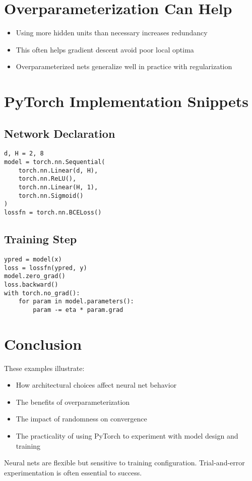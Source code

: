 \documentclass[11pt]{article}
\begin{document}
\section{Overparameterization Can Help}

\begin{itemize}
    \item Using more hidden units than necessary increases redundancy
    \item This often helps gradient descent avoid poor local optima
    \item Overparameterized nets generalize well in practice with regularization
\end{itemize}

\section{PyTorch Implementation Snippets}

\subsection*{Network Declaration}
\begin{verbatim}
d, H = 2, 8
model = torch.nn.Sequential(
    torch.nn.Linear(d, H),
    torch.nn.ReLU(),
    torch.nn.Linear(H, 1),
    torch.nn.Sigmoid()
)
lossfn = torch.nn.BCELoss()
\end{verbatim}

\subsection*{Training Step}
\begin{verbatim}
ypred = model(x)
loss = lossfn(ypred, y)
model.zero_grad()
loss.backward()
with torch.no_grad():
    for param in model.parameters():
        param -= eta * param.grad
\end{verbatim}

\section{Conclusion}

These examples illustrate:
\begin{itemize}
    \item How architectural choices affect neural net behavior
    \item The benefits of overparameterization
    \item The impact of randomness on convergence
    \item The practicality of using PyTorch to experiment with model design and training
\end{itemize}

Neural nets are flexible but sensitive to training configuration. Trial-and-error experimentation is often essential to success.
\end{document}
